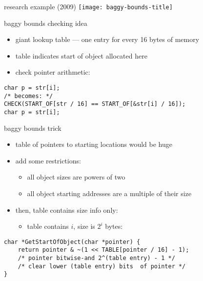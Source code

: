 \begin{frame}{research example (2009)}
    \texttt{[image: baggy-bounds-title]}
\end{frame}

\begin{frame}[fragile,label=lookupTable]{baggy bounds checking idea}
    \begin{itemize}
        \item giant lookup table --- one entry for every 16 bytes of memory
        \item table indicates start of object allocated here
        \item check pointer arithmetic:
    \end{itemize}
\begin{lstlisting}
char p = str[i];
/* becomes: */
CHECK(START_OF[str / 16] == START_OF[&str[i] / 16]);
char p = str[i];
\end{lstlisting}
\end{frame}


\begin{frame}[fragile,label=baggyBoundsTrick]{baggy bounds trick}
\lstset{language=C,style=small}
    \begin{itemize}
        \item table of pointers to starting locations would be huge
        \item add some restrictions:
            \begin{itemize}
            \item all object sizes are powers of two
            \item all object starting addresses are a multiple of their size
            \end{itemize}
        \item then, table contains size info only:
            \begin{itemize}
            \item table contains $i$, size is $2^i$ bytes:
            \end{itemize}
    \end{itemize}
\begin{lstlisting}
char *GetStartOfObject(char *pointer) {
    return pointer & ~(1 << TABLE[pointer / 16] - 1);
    /* pointer bitwise-and 2^(table entry) - 1 */
    /* clear lower (table entry) bits  of pointer */
}
\end{lstlisting}
\end{frame}

